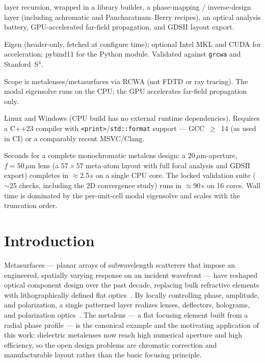 \documentclass[preprint,12pt]{elsarticle}
\begin{document}
\begin{description}
      layer recursion, wrapped in a library builder, a phase-mapping / inverse-design
      layer (including achromatic and Pancharatnam--Berry recipes), an optical analysis
      battery, GPU-accelerated far-field propagation, and GDSII layout export.
\item[Dependencies:] Eigen (header-only, fetched at configure time); optional Intel MKL
      and CUDA for acceleration; pybind11 for the Python module. Validated against
      \texttt{grcwa} and Stanford~S$^4$.
\item[Restrictions:] Scope is metalenses/metasurfaces via RCWA (not FDTD or ray
      tracing). The modal eigensolve runs on the CPU; the GPU accelerates far-field
      propagation only.
\item[Operating systems:] Linux and Windows (CPU build has no external runtime
      dependencies). Requires a C++23 compiler with \texttt{<print>}/\texttt{std::format}
      support --- GCC~$\geq$~14 (as used in CI) or a comparably recent MSVC/Clang.
\item[Running time:] Seconds for a complete monochromatic metalens design: a
      $20\,\mu$m-aperture, $f=50\,\mu$m lens (a $57\times57$ meta-atom layout with
      full focal analysis and GDSII export) completes in $\approx$2.5\,s on a single
      CPU core. The locked validation suite ($\sim$25 checks, including the 2D
      convergence study) runs in $\approx$90\,s on 16 cores. Wall time is dominated
      by the per-unit-cell modal eigensolve and scales with the truncation order.
\end{description}

\section{Introduction}
Metasurfaces --- planar arrays of subwavelength scatterers that impose an
engineered, spatially varying response on an incident wavefront --- have reshaped
optical component design over the past decade, replacing bulk refractive elements
with lithographically defined flat optics~\cite{yu2011,yu2014flat,kildishev2013}.
By locally controlling phase, amplitude, and polarization, a single patterned layer
realizes lenses, deflectors, holograms, and polarization
optics~\cite{arbabi2015}. The metalens --- a flat focusing element built from a
radial phase profile --- is the canonical example and the motivating application of
this work: dielectric metalenses now reach high numerical aperture and high
efficiency, so the open design problems are chromatic correction and manufacturable
layout rather than the basic focusing principle.
\end{document}

